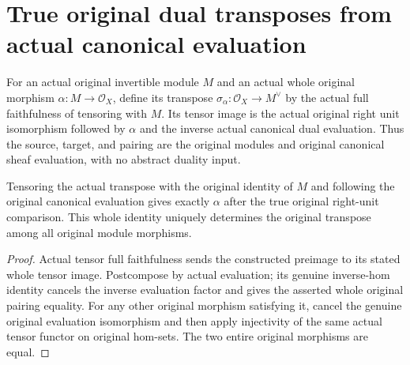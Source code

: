 \section{True original dual transposes from actual canonical evaluation}

\begin{definition}
\label{def:actual-invertible-dual-transpose}
\leanok
{}
For an actual original invertible module $M$ and an actual whole
original morphism $\alpha:M\to\mathcal O_X$, define its transpose
$\sigma_\alpha:\mathcal O_X\to M^\vee$ by the actual full
faithfulness of tensoring with $M$. Its tensor image is the
actual original right unit isomorphism followed by $\alpha$ and
the inverse actual canonical dual evaluation. Thus the source,
target, and pairing are the original modules and original
canonical sheaf evaluation, with no abstract duality input.
\end{definition}

\begin{lemma}
\label{lem:actual-invertible-dual-transpose-pairing}
\leanok
{}
Tensoring the actual transpose with the original identity of $M$
and following the original canonical evaluation gives exactly
$\alpha$ after the true original right-unit comparison. This
whole identity uniquely determines the original transpose among
all original module morphisms.
\end{lemma}
\begin{proof}
Actual tensor full faithfulness sends the constructed preimage to
its stated whole tensor image. Postcompose by actual evaluation;
its genuine inverse-hom identity cancels the inverse evaluation
factor and gives the asserted whole original pairing equality.
For any other original morphism satisfying it, cancel the genuine
original evaluation isomorphism and then apply injectivity of the
same actual tensor functor on original hom-sets. The two entire
original morphisms are equal.
\end{proof}
